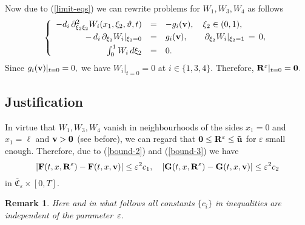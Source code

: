 \documentclass[reqno]{amsart}            %
\newtheorem{remark}{Remark}[section]
\numberwithin{equation}{section}
\begin{document}
Now due to (\ref{limit-eqs}) we can rewrite problems for  $W_1,  W_3, W_4$ as follows
 \begin{equation}\label{Neumann-prob-2}
\left\{
    \begin{array}{rcl}
- d_i \,\partial_{\xi_2\xi_2}^2 {W}_i(x_1, \xi_2, \vartheta, t) &=& - g_i({\bf v}),   \ \ \  \xi_2\in (0, 1),
\\[1mm]
 - \,d_i \,\partial_{\xi_2} {W}_i|_{\xi_2=0} &=&  g_i({\bf v}), \qquad \partial_{\xi_2} {W}_i|_{\xi_2=1} \, =\,  0,
\\[1mm]
 \int_0^1 {W}_i\, d\xi_2&=&0.
\end{array}\right.
\end{equation}
Since $g_i({\bf v})|_{t=0}=0,$  we have $W_i|_{t=0}=0$ at $i\in\{1, 3, 4\}.$ Therefore,
${\bf R}^\varepsilon|_{t=0} = {\bf 0}.$


\subsection{Justification}

In virtue that $W_1,  W_3, W_4$ vanish in neighbourhoods of the sides $x_1=0$ and $x_1=\ell$
and ${\bf v} > {\bf 0}$ (see before), we can regard that
${\bf 0} \le {\bf R}^\varepsilon \le {\bf \tilde{u}}$ for $\varepsilon$ small enough.
Therefore, due to (\ref{bound-2}) and (\ref{bound-3}) we have
\begin{equation}\label{bound-4}
\left| {\bf F}(t,x,{\bf R}^\varepsilon) - {\bf F}(t,x,{\bf v}) \right| \le \varepsilon^2 c_1,
  \quad
\left| {\bf G}(t,x,{\bf R}^\varepsilon) - {\bf G}(t,x,{\bf v}) \right| \le \varepsilon^2 c_2
\end{equation}
in $\overline{\mathfrak{C}}_\varepsilon \times [0,T].$

\begin{remark}
Here and in what follows all constants $\{c_i\}$ in inequalities are independent of the parameter~$\varepsilon.$
\end{remark}
\end{document}
